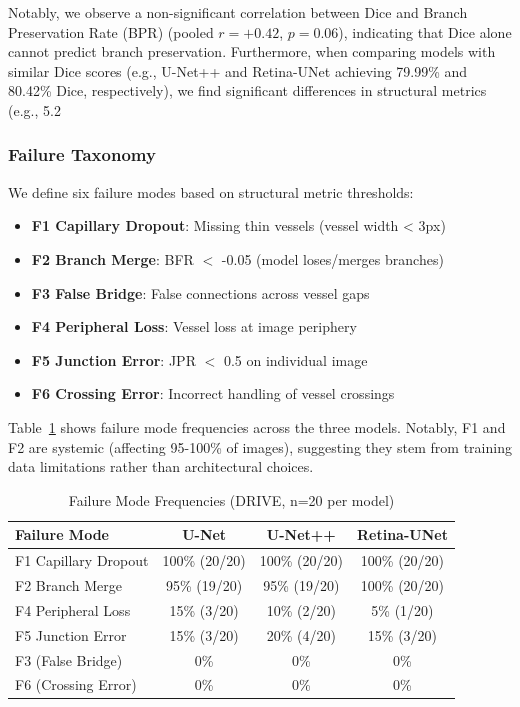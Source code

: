 \documentclass[conference]{IEEEtran}
\begin{document}
Notably, we observe a non-significant correlation between Dice and Branch Preservation Rate (BPR) (pooled $r=+0.42$, $p=0.06$), indicating that Dice alone cannot predict branch preservation. Furthermore, when comparing models with similar Dice scores (e.g., U-Net++ and Retina-UNet achieving 79.99\% and 80.42\% Dice, respectively), we find significant differences in structural metrics (e.g., 5.2%


\subsubsection{Failure Taxonomy}
We define six failure modes based on structural metric thresholds:
\begin{itemize}
    \item \textbf{F1 Capillary Dropout}: Missing thin vessels (vessel width < 3px)
    \item \textbf{F2 Branch Merge}: BFR $<$ -0.05 (model loses/merges branches)
    \item \textbf{F3 False Bridge}: False connections across vessel gaps
    \item \textbf{F4 Peripheral Loss}: Vessel loss at image periphery
    \item \textbf{F5 Junction Error}: JPR $<$ 0.5 on individual image
    \item \textbf{F6 Crossing Error}: Incorrect handling of vessel crossings
\end{itemize}

Table~\ref{tab:failure_taxonomy} shows failure mode frequencies across the three models. Notably, F1 and F2 are systemic (affecting 95-100\% of images), suggesting they stem from training data limitations rather than architectural choices.

\begin{table}[htbp]
\caption{Failure Mode Frequencies (DRIVE, n=20 per model)}
\label{tab:failure_taxonomy}
\centering
\footnotesize
\setlength{\tabcolsep}{4pt}
\begin{tabular}{lccc}
\toprule
\textbf{Failure Mode} & \textbf{U-Net} & \textbf{U-Net++} & \textbf{Retina-UNet} \\
\midrule
F1 Capillary Dropout & 100\% (20/20) & 100\% (20/20) & 100\% (20/20) \\
F2 Branch Merge & 95\% (19/20) & 95\% (19/20) & 100\% (20/20) \\
F4 Peripheral Loss & 15\% (3/20) & 10\% (2/20) & 5\% (1/20) \\
F5 Junction Error & 15\% (3/20) & 20\% (4/20) & 15\% (3/20) \\
F3 (False Bridge) & 0\% & 0\% & 0\% \\
F6 (Crossing Error) & 0\% & 0\% & 0\% \\
\bottomrule
\end{tabular}
\end{table}
\end{document}

